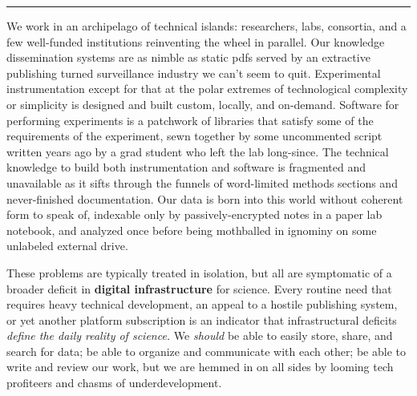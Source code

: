 \begin{center}\rule{0.5\linewidth}{0.5pt}\end{center}


We work in an archipelago of technical islands: researchers, labs,
consortia, and a few well-funded institutions reinventing the wheel in
parallel. Our knowledge dissemination systems are as nimble as static
pdfs served by an extractive
publishing turned surveillance industry we can't seem to quit.
Experimental instrumentation except for that at the polar extremes of
technological complexity or simplicity is designed and built custom,
locally, and on-demand. Software for performing experiments is a
patchwork of libraries that satisfy some of the requirements of the
experiment, sewn together by some uncommented script written years ago
by a grad student who left the lab long-since. The technical knowledge
to build both instrumentation and software is fragmented and unavailable
as it sifts through the funnels of word-limited methods sections and
never-finished documentation. Our data is born into this world without
coherent form to speak of, indexable only by passively-encrypted notes
in a paper lab notebook, and analyzed once before being mothballed in
ignominy on some unlabeled external drive.

These problems are typically treated in isolation, but all are
symptomatic of a broader deficit in \textbf{digital infrastructure} for
science. Every routine need that requires heavy technical development,
an appeal to a hostile publishing system, or yet another platform
subscription is an indicator that infrastructural deficits \emph{define
the daily reality of science.} We \emph{should} be able to easily store,
share, and search for data; be able to organize and communicate with
each other; be able to write and review our work, but we are hemmed in
on all sides by looming tech profiteers and chasms of underdevelopment.


